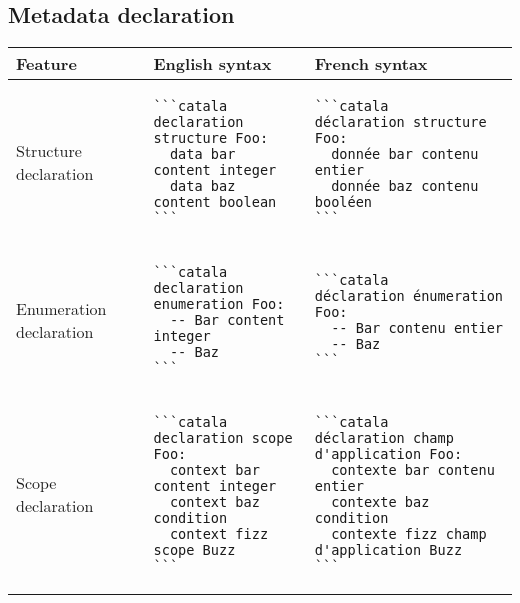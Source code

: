 \documentclass[a3paper,landscape]{article}
\begin{document}
\begin{multicols*}{2}
  \section*{Metadata declaration}
  \begin{tabular}{p{}p{}p{}}
    \toprule
    Feature                 & English syntax & French syntax \\\midrule
    Structure declaration   &
    \vspace*{-1.75em}
    \begin{verbatim}
```catala
declaration structure Foo:
  data bar content integer
  data baz content boolean
```
\end{verbatim}
    \vspace*{-1.75em}
                            &
    \vspace*{-1.75em}
    \begin{verbatim}
```catala
déclaration structure Foo:
  donnée bar contenu entier
  donnée baz contenu booléen
```
\end{verbatim}
    \vspace*{-1.75em}
    \\
    Enumeration declaration &
    \vspace*{-1.75em}
    \begin{verbatim}
```catala
declaration enumeration Foo:
  -- Bar content integer
  -- Baz
```
\end{verbatim}
    \vspace*{-1.75em}
                            &
    \vspace*{-1.75em}
    \begin{verbatim}
```catala
déclaration énumeration Foo:
  -- Bar contenu entier
  -- Baz
```
\end{verbatim}
    \vspace*{-1.75em}                                        \\
    Scope declaration       &
    \vspace*{-1.75em}
    \begin{verbatim}
```catala
declaration scope Foo:
  context bar content integer
  context baz condition
  context fizz scope Buzz
```
\end{verbatim}
    \vspace*{-1.75em}
                            &
    \vspace*{-1.75em}
    \begin{verbatim}
```catala
déclaration champ d'application Foo:
  contexte bar contenu entier
  contexte baz condition
  contexte fizz champ d'application Buzz
```
\end{verbatim}
    \vspace*{-1.75em}                                        \\
    \bottomrule
  \end{tabular}












\end{multicols*}
\end{document}
